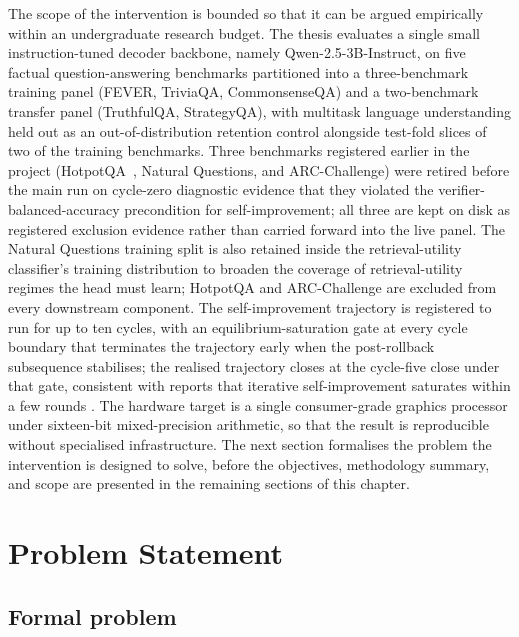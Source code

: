 The scope of the intervention is bounded so that it can be argued empirically within an undergraduate research budget. The thesis evaluates a single small instruction-tuned decoder backbone, namely Qwen-2.5-3B-Instruct, on five factual question-answering benchmarks partitioned into a three-benchmark training panel (FEVER, TriviaQA, CommonsenseQA) and a two-benchmark transfer panel (TruthfulQA, StrategyQA), with multitask language understanding held out as an out-of-distribution retention control alongside test-fold slices of two of the training benchmarks. Three benchmarks registered earlier in the project (HotpotQA~\cite{yang-etal-2018-hotpotqa}, Natural Questions, and ARC-Challenge) were retired before the main run on cycle-zero diagnostic evidence that they violated the verifier-balanced-accuracy precondition for self-improvement; all three are kept on disk as registered exclusion evidence rather than carried forward into the live panel. The Natural Questions training split is also retained inside the retrieval-utility classifier's training distribution to broaden the coverage of retrieval-utility regimes the head must learn; HotpotQA and ARC-Challenge are excluded from every downstream component. The self-improvement trajectory is registered to run for up to ten cycles, with an equilibrium-saturation gate at every cycle boundary that terminates the trajectory early when the post-rollback subsequence stabilises; the realised trajectory closes at the cycle-five close under that gate, consistent with reports that iterative self-improvement saturates within a few rounds \cite{song2024gap}. The hardware target is a single consumer-grade graphics processor under sixteen-bit mixed-precision arithmetic, so that the result is reproducible without specialised infrastructure. The next section formalises the problem the intervention is designed to solve, before the objectives, methodology summary, and scope are presented in the remaining sections of this chapter.

\section{Problem Statement}
\label{sec:problem}

\subsection{Formal problem}
\label{sec:formal-problem}

